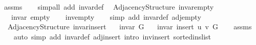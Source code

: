 \begin{isabellebody}
%
\isatagproof
{}\isamarkupfalse%
\ assms\isanewline
\ \ \isamarkupfalse%
\ {\isacharparenleft}{\kern0pt}simp{\isacharunderscore}{\kern0pt}all\ add{\isacharcolon}{\kern0pt}\ invar{\isacharunderscore}{\kern0pt}def{\isacharparenright}{\kern0pt}%
\endisatagproof
{\isafoldproof}%
%
\isadelimproof
\isanewline
%
\endisadelimproof
%
\isadeliminvisible
\isanewline
%
\endisadeliminvisible
%
\isataginvisible
{}\isamarkupfalse%
\ {\isacharparenleft}{\kern0pt}\ Adjacency{\isacharunderscore}{\kern0pt}Structure{\isacharparenright}{\kern0pt}\ invar{\isacharunderscore}{\kern0pt}empty{\isacharcolon}{\kern0pt}\isanewline
\ \ \ {\isachardoublequoteopen}invar\ empty{\isachardoublequoteclose}%
\endisataginvisible
{\isafoldinvisible}%
%
\isadeliminvisible
\isanewline
%
\endisadeliminvisible
%
\isadelimproof
\ \ %
\endisadelimproof
%
\isatagproof
{}\isamarkupfalse%
\ inv{\isacharunderscore}{\kern0pt}empty\isanewline
\ \ \isamarkupfalse%
\ {\isacharparenleft}{\kern0pt}simp\ add{\isacharcolon}{\kern0pt}\ invar{\isacharunderscore}{\kern0pt}def\ adj{\isacharunderscore}{\kern0pt}empty{\isacharparenright}{\kern0pt}%
\endisatagproof
{\isafoldproof}%
%
\isadelimproof
\isanewline
%
\endisadelimproof
%
\isadeliminvisible
\isanewline
%
\endisadeliminvisible
%
\isataginvisible
{}\isamarkupfalse%
\ {\isacharparenleft}{\kern0pt}\ Adjacency{\isacharunderscore}{\kern0pt}Structure{\isacharparenright}{\kern0pt}\ invar{\isacharunderscore}{\kern0pt}insert{\isacharcolon}{\kern0pt}\isanewline
\ \ \ {\isachardoublequoteopen}invar\ G{\isachardoublequoteclose}\isanewline
\ \ \ {\isachardoublequoteopen}invar\ {\isacharparenleft}{\kern0pt}insert\ u\ v\ G{\isacharparenright}{\kern0pt}{\isachardoublequoteclose}%
\endisataginvisible
{\isafoldinvisible}%
%
\isadeliminvisible
\isanewline
%
\endisadeliminvisible
%
\isadelimproof
\ \ %
\endisadelimproof
%
\isatagproof
{}\isamarkupfalse%
\ assms\isanewline
\ \ \isamarkupfalse%
\ {\isacharparenleft}{\kern0pt}auto\ simp\ add{\isacharcolon}{\kern0pt}\ invar{\isacharunderscore}{\kern0pt}def\ adj{\isacharunderscore}{\kern0pt}insert\ intro{\isacharcolon}{\kern0pt}\ inv{\isacharunderscore}{\kern0pt}insert\ sorted{\isacharunderscore}{\kern0pt}ins{\isacharunderscore}{\kern0pt}list{\isacharparenright}{\kern0pt}%
\endisatagproof
{\isafoldproof}%
%
\isadelimproof
\isanewline
%
\endisadelimproof
%
\isadeliminvisible
\isanewline
%
\endisadeliminvisible
%
\isataginvisible

\end{isabellebody}
